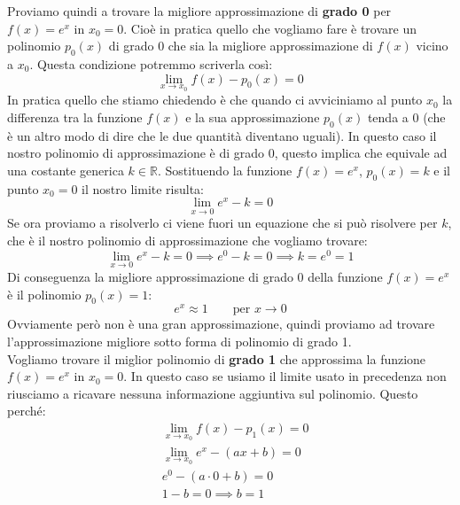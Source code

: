 Proviamo quindi a trovare la migliore approssimazione di \textbf{grado 0} per 
$f(x) = e^x$ in $x_0 = 0$. Cioè in pratica quello che vogliamo fare è trovare 
un polinomio $p_0(x)$ di grado $0$ che sia la migliore approssimazione di 
$f(x)$ vicino a $x_0$. Questa condizione potremmo scriverla così:
\begin{equation*}
	\lim_{x \to x_0} f(x) - p_0(x) = 0
\end{equation*}
In pratica quello che stiamo chiedendo è che quando ci avviciniamo al punto 
$x_0$ la differenza tra la funzione $f(x)$ e la sua approssimazione $p_0(x)$ 
tenda a 0 (che è un altro modo di dire che le due quantità diventano uguali). 
In questo caso il nostro polinomio di approssimazione è di grado 0, questo 
implica che equivale ad una costante generica $k \in \mathbb{R}$. Sostituendo 
la funzione $f(x) = e^x$, $p_0(x) = k$ e il punto $x_0 = 0$ il nostro limite 
risulta:
\begin{equation*}
	\lim_{x \to 0} e^x - k  = 0
\end{equation*}
Se ora proviamo a risolverlo ci viene fuori un equazione che si può risolvere 
per $k$, che è il nostro polinomio di approssimazione che vogliamo trovare:
\begin{equation*}
	\lim_{x \to 0} e^x - k  = 0 \implies e^0 - k  = 0 \implies k = e^0 = 1
\end{equation*}
Di conseguenza la migliore approssimazione di grado 0 della funzione $f(x) = 
e^x$ è il polinomio $p_0(x) = 1$:
\begin{equation*}
	e^x \approx 1 \qquad \text{per } x \to 0
\end{equation*}
Ovviamente però non è una gran approssimazione, quindi proviamo ad trovare 
l'approssimazione migliore sotto forma di polinomio di grado 1.\\

Vogliamo trovare il miglior polinomio di \textbf{grado 1} che approssima la 
funzione $f(x) = e^x$ in $x_0 = 0$. In questo caso se usiamo il limite usato in 
precedenza non riusciamo a ricavare nessuna informazione aggiuntiva sul 
polinomio. Questo perché:
\begin{align*}
	&\lim_{x \to x_0} f(x) - p_1(x) = 0\\
	&\lim_{x \to x_0} e^x - (ax + b) = 0\\
	&e^0 - (a \cdot 0 + b) = 0\\
	&1 - b = 0 \implies b = 1
\end{align*}

